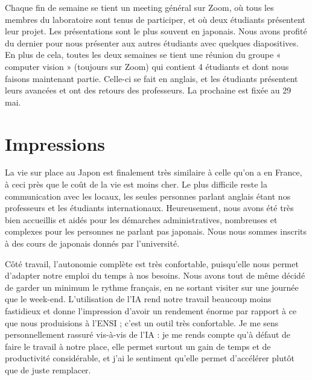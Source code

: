 \documentclass[12pt,a4paper]{article}
\begin{document}
\vspace{0.5cm}

Chaque fin de semaine se tient un meeting général sur Zoom, où tous les membres du laboratoire sont tenus de participer, et où deux étudiants présentent leur projet. Les présentations sont le plus souvent en japonais. Nous avons profité du dernier pour nous présenter aux autres étudiants avec quelques diapositives. En plus de cela, toutes les deux semaines se tient une réunion du groupe « computer vision » (toujours sur Zoom) qui contient 4 étudiants et dont nous faisons maintenant partie. Celle-ci se fait en anglais, et les étudiants présentent leurs avancées et ont des retours des professeurs. La prochaine est fixée au 29 mai.

\vspace{0.5cm}

\section*{Impressions}
La vie sur place au Japon est finalement très similaire à celle qu'on a en France, à ceci près que le coût de la vie est moins cher. Le plus difficile reste la communication avec les locaux, les seules personnes parlant anglais étant nos professeurs et les étudiants internationaux. Heureusement, nous avons été très bien accueillis et aidés pour les démarches administratives, nombreuses et complexes pour les personnes ne parlant pas japonais. Nous nous sommes inscrits à des cours de japonais donnés par l'université.

\vspace{0.5cm}

Côté travail, l'autonomie complète est très confortable, puisqu'elle nous permet d'adapter notre emploi du temps à nos besoins. Nous avons tout de même décidé de garder un minimum le rythme français, en ne sortant visiter sur une journée que le week-end. L'utilisation de l'IA rend notre travail beaucoup moins fastidieux et donne l'impression d'avoir un rendement énorme par rapport à ce que nous produisions à l'ENSI ; c'est un outil très confortable. Je me sens personnellement rassuré vis-à-vis de l'IA : je me rends compte qu'à défaut de faire le travail à notre place, elle permet surtout un gain de temps et de productivité considérable, et j'ai le sentiment qu'elle permet d'accélérer plutôt que de juste remplacer.
\end{document}
